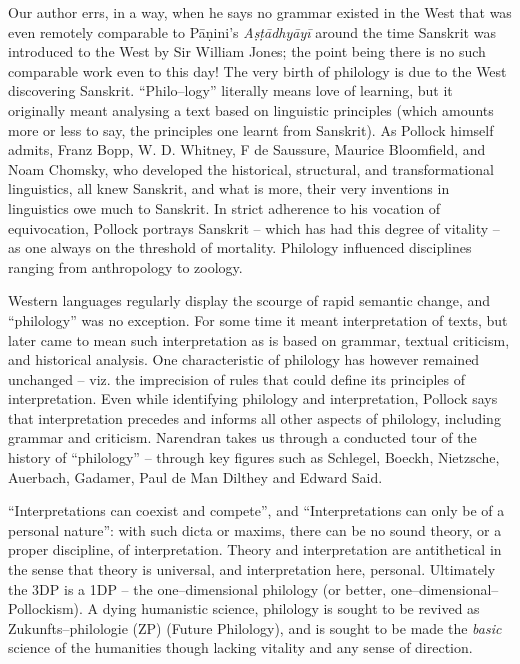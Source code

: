 {Our author errs, in a way, when he says no grammar existed in the West that was even remotely comparable to Pāṇini’s \textit{Aṣṭādhyāyī} around the time Sanskrit was introduced to the West by Sir William Jones; the point being there is no such comparable work even to this day! The very birth of philology is due to the West discovering Sanskrit. “Philo–logy” literally means love of learning, but it originally meant analysing a text based on linguistic principles (which amounts more or less to say, the principles one learnt from Sanskrit). As Pollock himself admits, Franz Bopp, W. D. Whitney, F de Saussure, Maurice Bloomfield, and Noam Chomsky, who developed the historical, structural, and transformational linguistics, all knew Sanskrit, and what is more, their very inventions in linguistics owe much to Sanskrit. In strict adherence to his vocation of equivocation, Pollock portrays Sanskrit – which has had this degree of vitality – as one always on the threshold of mortality. Philology influenced disciplines ranging from anthropology to zoology.

Western languages regularly display the scourge of rapid semantic change, and “philology” was no exception. For some time it meant interpretation of texts, but later came to mean such interpretation as is based on grammar, textual criticism, and historical analysis. One characteristic of philology has however remained unchanged – viz. the imprecision of rules that could define its principles of interpretation. Even while identifying philology and interpretation, Pollock says that interpretation precedes and informs all other aspects of philology, including grammar and criticism. Narendran takes us through a conducted tour of the history of “philology” – through key figures such as Schlegel, Boeckh, Nietzsche, Auerbach, Gadamer, Paul de Man Dilthey and Edward Said.

“Interpretations can coexist and compete”, and “Interpretations can only be of a personal nature”: with such dicta or maxims, there can be no sound theory, or a proper discipline, of interpretation. Theory and interpretation are antithetical in the sense that theory is universal, and interpretation here, personal. Ultimately the 3DP is a 1DP – the one–dimensional philology (or better, one–dimensional–Pollockism). A dying humanistic science, philology is sought to be revived as Zukunfts–philologie (ZP) (Future Philology), and is sought to be made the \textit{basic} science of the humanities though lacking vitality and any sense of direction.

}
